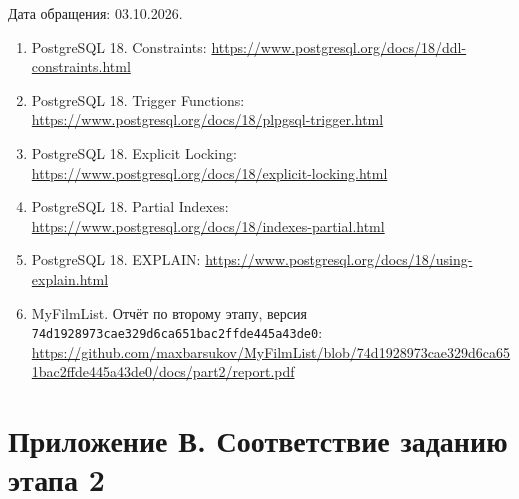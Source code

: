 Дата обращения: 03.10.2026.

\begin{enumerate}
\item Postgre\allowbreak{}SQL 18. Constraints: \url{https://www.postgresql.org/docs/18/ddl-constraints.html}
\item Postgre\allowbreak{}SQL 18. Trigger Functions: \url{https://www.postgresql.org/docs/18/plpgsql-trigger.html}
\item Postgre\allowbreak{}SQL 18. Explicit Locking: \url{https://www.postgresql.org/docs/18/explicit-locking.html}
\item Postgre\allowbreak{}SQL 18. Partial Indexes: \url{https://www.postgresql.org/docs/18/indexes-partial.html}
\item Postgre\allowbreak{}SQL 18. EXPLAIN: \url{https://www.postgresql.org/docs/18/using-explain.html}
\item My\allowbreak{}Film\allowbreak{}List. Отчёт по второму этапу, версия \nolinkurl{74d1928973cae329d6ca651bac2ffde445a43de0}: \url{https://github.com/maxbarsukov/MyFilmList/blob/74d1928973cae329d6ca651bac2ffde445a43de0/docs/part2/report.pdf}
\end{enumerate}

\clearpage
\section*{Приложение В. Соответствие заданию этапа 2}
{}

